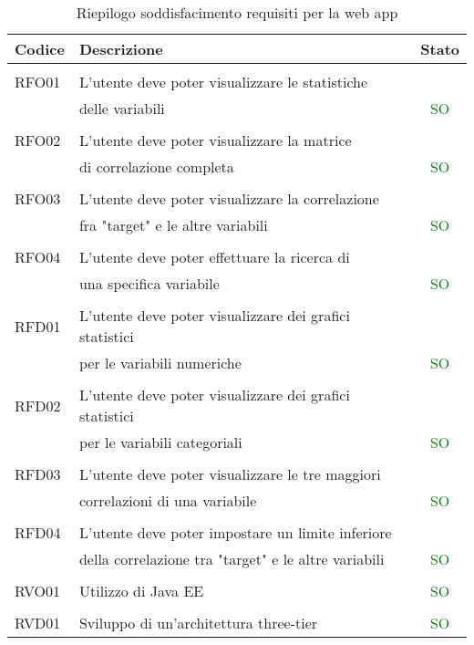 \clearpage
\begin{table}[!h] %
	\caption{Riepilogo soddisfacimento requisiti per la web app}
	\label{tab:soddisfacimento-app}
	\centering
	\begin{tabular}{ l | l | c}
		\textbf{Codice} & \textbf{Descrizione} & \textbf{Stato}\\
		\hline
		\hline
		\\[-2.5mm]
		RFO01 & L'utente deve poter visualizzare le statistiche \\ & delle variabili & \textcolor{green}{SO} \\
		\hline
		\\[-2.5mm]
		RFO02 & L'utente deve poter visualizzare la matrice \\ & di correlazione completa & \textcolor{green}{SO} \\
		\hline
		\\[-2.5mm]
		RFO03 & L'utente deve poter visualizzare la correlazione \\ & fra "target" e le altre variabili & \textcolor{green}{SO} \\
		\hline
		\\[-2.5mm]
		RFO04 & L'utente deve poter effettuare la ricerca di \\ & una specifica variabile & \textcolor{green}{SO} \\
		\hline
		\hline
		\\[-2.5mm]
		RFD01 & L'utente deve poter visualizzare dei grafici statistici \\ & per le variabili numeriche & \textcolor{green}{SO} \\
		\hline
		\\[-2.5mm]
		RFD02 & L'utente deve poter visualizzare dei grafici statistici \\ & per le variabili categoriali & \textcolor{green}{SO} \\
		\hline
		\\[-2.5mm]
		RFD03 & L'utente deve poter visualizzare le tre maggiori \\ & correlazioni di una variabile & \textcolor{green}{SO} \\
		\hline
		\\[-2.5mm]
		RFD04 & L'utente deve poter impostare un limite inferiore \\ & della correlazione tra "target" e le altre variabili & \textcolor{green}{SO} \\
		\hline
		\hline
		\\[-2.5mm]
		RVO01 & Utilizzo di Java EE & \textcolor{green}{SO} \\
		\hline\hline
		\\[-2.5mm]
		RVD01 & Sviluppo di un'architettura three-tier & \textcolor{green}{SO} \\
		\hline
	\end{tabular}
\end{table}%

